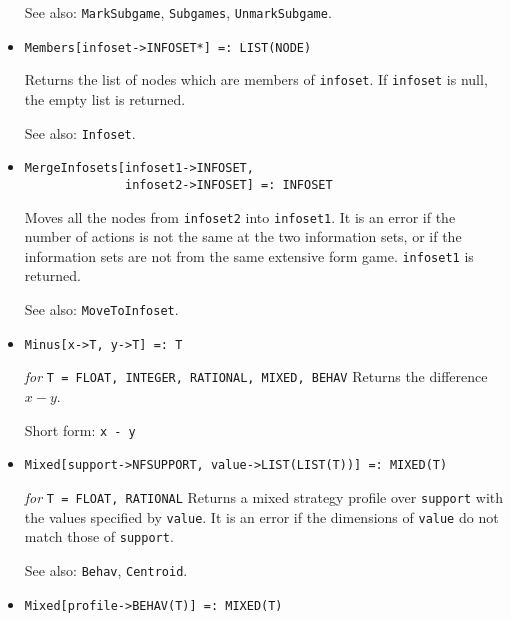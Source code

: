 \begin{itemize}
{\it for} {\tt T = FLOAT, RATIONAL}
\bd
Returns the list of nodes currently marked as roots of subgames in
\verb+efg+.  
\item [See also:] \verb+MarkSubgame+, \verb+Subgames+, \verb+UnmarkSubgame+.
\ed

\item
\protect \large \begin{verbatim}
Members[infoset->INFOSET*] =: LIST(NODE)
\end{verbatim}\normalsize

\bd
Returns the list of nodes which are members of \verb+infoset+.  If
\verb+infoset+ is null, the empty list is returned.
\item [See also:] \verb+Infoset+.
\ed

\item
\protect \large \begin{verbatim}
MergeInfosets[infoset1->INFOSET,
              infoset2->INFOSET] =: INFOSET
\end{verbatim}\normalsize

\bd
Moves all the nodes from \verb+infoset2+ into \verb+infoset1+.
It is an error if the number of actions is not the same at the
two information sets, or if the information sets are not from the
same extensive form game.  \verb+infoset1+ is returned.
\item [See also:] \verb+MoveToInfoset+.
\ed

\item 
\protect \large \begin{verbatim}
Minus[x->T, y->T] =: T
\end{verbatim} \normalsize

{\it for} {\tt T = FLOAT, INTEGER, RATIONAL, MIXED, BEHAV}
\bd
Returns the difference $x - y$.
\item [Short form:] \verb+x - y+
\ed

\item
\protect \large \begin{verbatim}
Mixed[support->NFSUPPORT, value->LIST(LIST(T))] =: MIXED(T)
\end{verbatim}\normalsize

{\it for} {\tt T = FLOAT, RATIONAL}
\bd
Returns a mixed strategy profile over \verb+support+ with the values
specified by \verb+value+.  It is an error if the dimensions of
\verb+value+ do not match those of \verb+support+.
\item [See also:] \verb+Behav+, \verb+Centroid+.
\ed

\item
\protect \large \begin{verbatim}
Mixed[profile->BEHAV(T)] =: MIXED(T)
\end{verbatim}\normalsize


\end{itemize}

